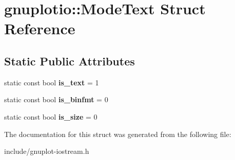 \hypertarget{structgnuplotio_1_1ModeText}{}\section{gnuplotio\+:\+:Mode\+Text Struct Reference}
\label{structgnuplotio_1_1ModeText}
\subsection*{Static Public Attributes}
\begin{DoxyCompactItemize}
\item 
\mbox{\label{structgnuplotio_1_1ModeText_a7083d8977c354a036a7c542bf99d3d52}} 
static const bool {\bfseries is\+\_\+text} = 1
\item 
\mbox{\label{structgnuplotio_1_1ModeText_a4c771363d894ae64d6af961ffde35126}} 
static const bool {\bfseries is\+\_\+binfmt} = 0
\item 
\mbox{\label{structgnuplotio_1_1ModeText_aaffc1e7bb26c6d1404cb5a3f03f13be9}} 
static const bool {\bfseries is\+\_\+size} = 0
\end{DoxyCompactItemize}


The documentation for this struct was generated from the following file\+:\begin{DoxyCompactItemize}
\item 
include/gnuplot-\/iostream.\+h\end{DoxyCompactItemize}
